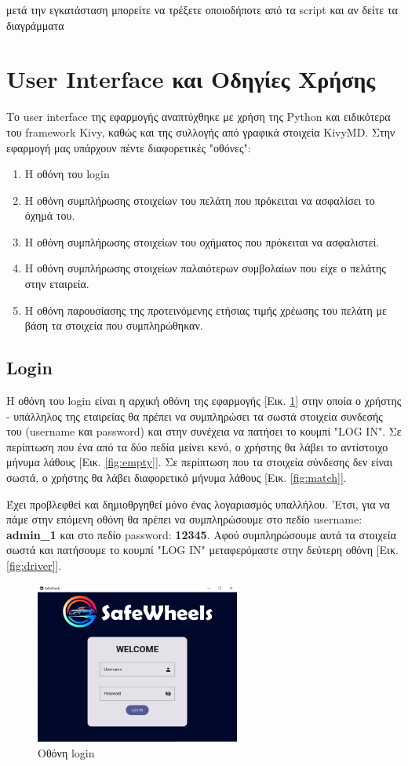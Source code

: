 \documentclass{llncs}
\begin{document}
μετά την εγκατάσταση μπορείτε να τρέξετε οποιοδήποτε από τα script και αν δείτε τα διαγράμματα


\section{User Interface και Οδηγίες Χρήσης}
Το user interface της εφαρμογής αναπτύχθηκε με χρήση της Python και ειδικότερα του framework Kivy, καθώς και της συλλογής από γραφικά στοιχεία KivyMD. Στην εφαρμογή μας υπάρχουν πέντε διαφορετικές "οθόνες":
\begin{enumerate}
    \item Η οθόνη του login
    \item Η οθόνη συμπλήρωσης στοιχείων του πελάτη που πρόκειται να ασφαλίσει το όχημά του.
    \item Η οθόνη συμπλήρωσης στοιχείων του οχήματος που πρόκειται να ασφαλιστεί.
    \item Η οθόνη συμπλήρωσης στοιχείων παλαιότερων συμβολαίων που είχε ο πελάτης στην εταιρεία.
    \item Η οθόνη παρουσίασης της προτεινόμενης ετήσιας τιμής χρέωσης του πελάτη με βάση τα στοιχεία που συμπληρώθηκαν.
\end{enumerate}

\subsection{Login}
Η οθόνη του login είναι η αρχική οθόνη της εφαρμογής [Εικ. \ref{fig:login}] στην οποία ο χρήστης - υπάλληλος της εταιρείας θα πρέπει να συμπληρώσει τα σωστά στοιχεία συνδεσής του (username και password) και στην συνέχεια να πατήσει το κουμπί "LOG IN". Σε περίπτωση που ένα από τα δύο πεδία μείνει κενό, ο χρήστης θα λάβει το αντίστοιχο μήνυμα λάθους [Εικ. \ref{fig:empty}].
Σε περίπτωση που τα στοιχεία σύνδεσης δεν είναι σωστά, ο χρήστης θα λάβει διαφορετικό μήνυμα λάθους [Εικ. \ref{fig:match}].

Έχει προβλεφθεί και δημιοθργηθεί μόνο ένας λογαριασμός υπαλλήλου. 'Ετσι, για να πάμε στην επόμενη οθόνη θα πρέπει να συμπληρώσουμε στο πεδίο username: \textbf{admin\_1} και στο πεδίο password: \textbf{12345}. Αφού συμπληρώσουμε αυτά τα στοιχεία σωστά και πατήσουμε το κουμπί "LOG IN" μεταφερόμαστε στην δεύτερη οθόνη [Εικ. \ref{fig:driver}].
\begin{figure}
    \begin{center}
        \includegraphics[width=0.6\textwidth]{images/login.png}
    \end{center}
    \caption{Οθόνη login} 
    \label{fig:login}   
\end{figure}
\end{document}

